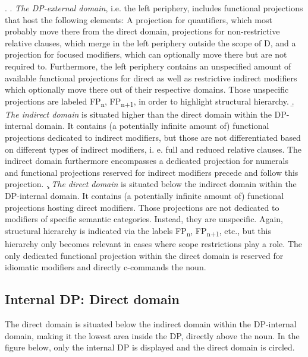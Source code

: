 \documentclass [output=book,colorlinks,citecolor=brown]{langscibook}
\begin{document}
\ex. \a. \textit{The DP-external domain}, i.e. the left periphery, includes functional projections that host the following elements: A projection for quantifiers, which most probably move there from the direct domain, projections for non-restrictive relative clauses, which merge in the left periphery outside the scope of D, and a projection for focused modifiers, which can optionally move there but are not required to. Furthermore, the left periphery contains an unspecified amount of available functional projections for direct as well as restrictive indirect modifiers which optionally move there out of their respective domains. Those unspecific projections are labeled FP\textsubscript{n}, FP\textsubscript{n+1}, in order to highlight structural hierarchy.
\b. \textit{The indirect domain} is situated higher than the direct domain within the DP-internal domain. It contains (a potentially infinite amount of) functional projections dedicated to indirect modifiers, but those are not differentiated based on different types of indirect modifiers, i. e. full and reduced relative clauses. The indirect domain furthermore encompasses a dedicated projection for numerals and functional projections reserved for indirect modifiers precede and follow this projection.
\c. \textit{The direct domain} is situated below the indirect domain within the DP-internal domain. It contains (a potentially infinite amount of) functional projections hosting direct modifiers. Those projections are not dedicated to modifiers of specific semantic categories. Instead, they are unspecific. Again, structural hierarchy is indicated via the labels FP\textsubscript{n}, FP\textsubscript{n+1}, etc., but this hierarchy only becomes relevant in cases where scope restrictions play a role. The only dedicated functional projection within the direct domain is reserved for idiomatic modifiers and directly c-commands the noun.

\newpage

\subsection{Internal DP: Direct domain} \label{internaldirect}

The direct domain is situated below the indirect domain within the DP-internal domain, making it the lowest area inside the DP, directly above the noun. In the figure below, only the internal DP is displayed and the direct domain is circled.

\end{document}
